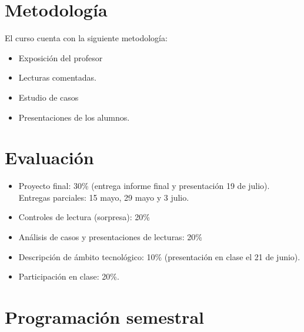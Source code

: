 \documentclass[11pt,letterpaper]{article}
\begin{document}
\section*{Metodología}
El curso cuenta con la siguiente metodología:
\begin{itemize}
  \item Exposición del profesor
  \item Lecturas comentadas.
  \item Estudio de casos
  \item Presentaciones de los alumnos.
\end{itemize}

\section*{Evaluación}
\begin{itemize}
  \item Proyecto final: 30\% (entrega informe final y presentación 19 de julio). Entregas parciales: 15 mayo, 29 mayo y 3 julio.

  \item Controles de lectura (sorpresa): 20\%
  \item Análisis de casos y presentaciones de lecturas: 20\%
  \item Descripción de ámbito tecnológico: 10\% (presentación en clase el 21 de junio).
  \item Participación en clase: 20\%.
\end{itemize}

%
%

\newpage

\section*{Programación semestral}
\end{document}

